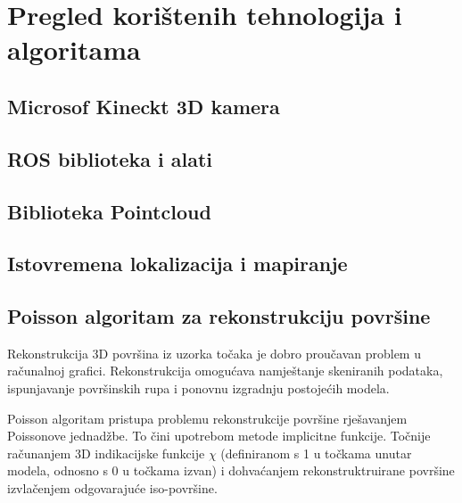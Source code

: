 \newpage
\setcounter{figure}{0}

\section{Pregled korištenih tehnologija i algoritama} %
\label{sec:Tehnologija i teorija}


\subsection{Microsof Kineckt 3D kamera} %
\label{sub:Microsof Kineckt 3D kamera}


\subsection{ROS biblioteka i alati} %
\label{sub:ROS biblioteka i alati}


\subsection{Biblioteka Pointcloud} %
\label{sub:Biblioteka Pointcloud}



\subsection{Istovremena lokalizacija i mapiranje} %
\label{sub:Slam}


\newpage
\subsection{Poisson algoritam za rekonstrukciju površine} %
\label{sub:Poisson}
Rekonstrukcija 3D površina iz uzorka točaka je dobro proučavan problem u
računalnoj grafici. Rekonstrukcija omogućava namještanje skeniranih
podataka, ispunjavanje površinskih rupa i ponovnu izgradnju postojećih
modela.

Poisson algoritam pristupa problemu rekonstrukcije površine rješavanjem
Poissonove jednadžbe. To čini upotrebom metode implicitne funkcije.
Točnije računanjem 3D indikacijske funkcije \(\chi\) (definiranom s 1 u
točkama unutar modela, odnosno s 0 u točkama izvan) i dohvaćanjem
rekonstruktruirane površine izvlačenjem odgovarajuće iso-površine.

